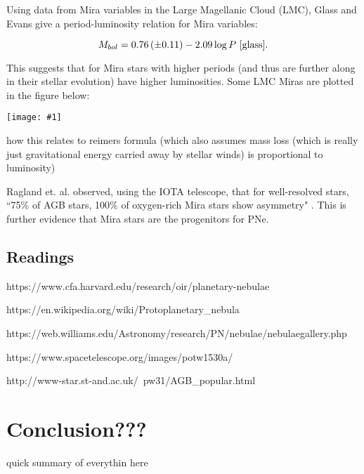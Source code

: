 \documentclass[a4paper,11pt]{article}
\newcommand{\fig}[1]{\centerline{\texttt{[image: \#1]}}}
\begin{document}
Using data from Mira variables in the Large Magellanic Cloud (LMC), Glass and Evans give a period-luminosity relation for Mira variables: 

\begin{equation*}
    M_{bol} = 0.76\,(\pm 0.11) - 2.09\log P~\text{\cite{glass}}.
\end{equation*}

This suggests that for Mira stars with higher periods (and thus are further along in their stellar evolution) have higher luminosities. Some LMC Miras are plotted in the figure below:

\vspace{0.2cm}
\fig{period_luminosity}

{\huge how this relates to reimers formula (which also assumes mass loss (which is really just gravitational energy carried away by stellar winds) is proportional to luminosity)}

Ragland et. al. observed, using the IOTA telescope, that for well-resolved stars, ``75\% of AGB stars, 100\% of oxygen-rich Mira stars show asymmetry" \cite{ragland}. This is further evidence that Mira stars are the progenitors for PNe. 

\subsection{Readings}

https://www.cfa.harvard.edu/research/oir/planetary-nebulae


https://en.wikipedia.org/wiki/Protoplanetary_nebula

https://web.williams.edu/Astronomy/research/PN/nebulae/nebulaegallery.php

https://www.spacetelescope.org/images/potw1530a/


http://www-star.st-and.ac.uk/~pw31/AGB_popular.html

\section{Conclusion???}

{\huge quick summary of everythin here}
\end{document}
